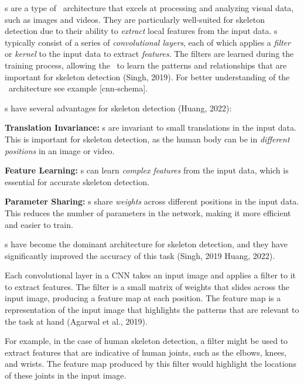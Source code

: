 \CNN\-s are a type of \NN\ architecture that excels at processing and analyzing visual data, such as images and videos. They are particularly well-suited for skeleton detection due to their ability to {\em extract} local features from the input data. \CNN\-s typically consist of a series of {\em convolutional layers}, each of which applies a {\em filter} or {\em kernel} to the input data to extract {\em features}. The filters are learned during the training process, allowing the \CNN\ to learn the patterns and relationships that are important for skeleton detection (\scc Singh, 2019). For better understanding of the \CNN\ architecture see example [cnn-schema].

\CNN\-s have several advantages for skeleton detection (\scc Huang, 2022):

\startitemize[1]
    \item {\bf Translation Invariance:} \CNN\-s are invariant to small translations in the input data. This is important for skeleton detection, as the human body can be in {\em different positions} in an image or video.
    \item {\bf Feature Learning:} \CNN\-s can learn {\em complex features} from the input data, which is essential for accurate skeleton detection.
    \item {\bf Parameter Sharing:} \CNN\-s share {\em weights} across different positions in the input data. This reduces the number of parameters in the network, making it more efficient and easier to train.
\stopitemize

\CNN\-s have become the dominant architecture for skeleton detection, and they have significantly improved the accuracy of this task (\scc Singh, 2019\; \scc Huang, 2022).


Each convolutional layer in a CNN takes an input image and applies a filter to it to extract features. The filter is a small matrix of weights that slides across the input image, producing a feature map at each position. The feature map is a representation of the input image that highlights the patterns that are relevant to the task at hand (\scc Agarwal et al., 2019).

For example, in the case of human skeleton detection, a filter might be used to extract features that are indicative of human joints, such as the elbows, knees, and wrists. The feature map produced by this filter would highlight the locations of these joints in the input image.

